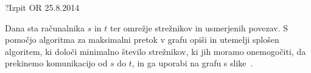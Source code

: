 \begin{naloga}{?}{Izpit OR 25.8.2014}
\begin{vprasanje}
Dana sta računalnika $s$ in $t$ ter omrežje strežnikov
in usmerjenih povezav.
S pomočjo algoritma za maksimalni pretok v grafu
opiši in utemelji splošen algoritem,
ki določi minimalno število strežnikov, ki jih moramo onemogočiti,
da prekinemo komunikacijo od $s$ do $t$,
in ga uporabi na grafu s slike~\fig{}.

\begin{slika}
\pgfslika
{}
\end{slika}
\end{vprasanje}
\begin{odgovor}
\end{odgovor}
\end{naloga}

